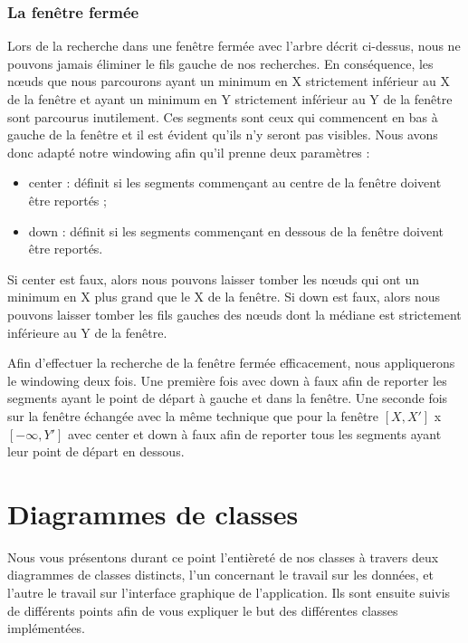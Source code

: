 \documentclass[10pt,a4paper]{article}
\begin{document}
\subsubsection{La fenêtre fermée}
Lors de la recherche dans une fenêtre fermée avec l'arbre décrit ci-dessus, nous ne pouvons jamais éliminer le fils gauche de nos recherches. En conséquence, les nœuds que nous parcourons ayant un minimum en X strictement inférieur au X de la fenêtre et ayant un minimum en Y strictement inférieur au Y de la fenêtre sont parcourus inutilement. Ces segments sont ceux qui commencent en bas à gauche de la fenêtre et il est évident qu'ils n'y seront pas visibles. Nous avons donc adapté notre windowing afin qu'il prenne deux paramètres :
\begin{itemize}
	\item center : définit si les segments commençant au centre de la fenêtre doivent être reportés ;
	\item down : définit si les segments commençant en dessous de la fenêtre doivent être reportés.
\end{itemize}
Si center est faux, alors nous pouvons laisser tomber les nœuds qui ont un minimum en X plus grand que le X de la fenêtre.
Si down est faux, alors nous pouvons laisser tomber les fils gauches des nœuds dont la médiane est strictement inférieure au Y de la fenêtre.

Afin d'effectuer la recherche de la fenêtre fermée efficacement, nous appliquerons le windowing deux fois. Une première fois avec down à faux afin de reporter les segments ayant le point de départ à gauche et dans la fenêtre. Une seconde fois sur la fenêtre échangée avec la même technique que pour la fenêtre $[X, X']$ x $[-\infty, Y']$ avec center et down à faux afin de reporter tous les segments ayant leur point de départ en dessous.

\newpage
\section{Diagrammes de classes}
Nous vous présentons durant ce point l’entièreté de nos classes à travers deux diagrammes de classes distincts, l'un concernant le travail sur les données, et l'autre le travail sur l'interface graphique de l'application. Ils sont ensuite suivis de différents points afin de vous expliquer le but des différentes classes implémentées.
\end{document}
